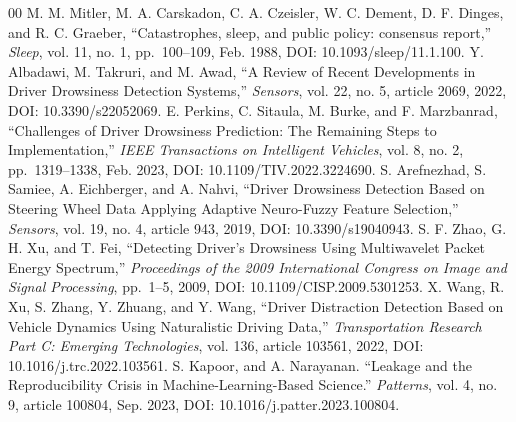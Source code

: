 \documentclass[letterpaper, 10 pt, conference]{ieeeconf}  %
\begin{document}




\begin{thebibliography}{00}
 M. M. Mitler, M. A. Carskadon, C. A. Czeisler, W. C. Dement, D. F. Dinges, and R. C. Graeber, 
    ``Catastrophes, sleep, and public policy: consensus report,'' 
    \textit{Sleep}, vol. 11, no. 1, pp.~100--109, Feb. 1988, DOI: 10.1093/sleep/11.1.100.
 Y. Albadawi, M. Takruri, and M. Awad,  
    ``A Review of Recent Developments in Driver Drowsiness Detection Systems,''  
    \textit{Sensors}, vol. 22, no. 5, article 2069, 2022, DOI: 10.3390/s22052069.
 E. Perkins, C. Sitaula, M. Burke, and F. Marzbanrad,  
    ``Challenges of Driver Drowsiness Prediction: The Remaining Steps to Implementation,''  
    \textit{IEEE Transactions on Intelligent Vehicles}, vol. 8, no. 2, pp.~1319--1338, Feb. 2023, DOI: 10.1109/TIV.2022.3224690.
 S. Arefnezhad, S. Samiee, A. Eichberger, and A. Nahvi,
    ``Driver Drowsiness Detection Based on Steering Wheel Data Applying Adaptive Neuro-Fuzzy Feature Selection,''
    \textit{Sensors}, vol. 19, no. 4, article 943, 2019, DOI: 10.3390/s19040943.
 S. F. Zhao, G. H. Xu, and T. Fei,
    ``Detecting Driver's Drowsiness Using Multiwavelet Packet Energy Spectrum,''
    \textit{Proceedings of the 2009 International Congress on Image and Signal Processing}, pp.~1--5, 2009, DOI: 10.1109/CISP.2009.5301253.
 X. Wang, R. Xu, S. Zhang, Y. Zhuang, and Y. Wang,
    ``Driver Distraction Detection Based on Vehicle Dynamics Using Naturalistic Driving Data,''
    \textit{Transportation Research Part C: Emerging Technologies}, vol. 136, article 103561, 2022, DOI: 10.1016/j.trc.2022.103561.
 S. Kapoor, and A. Narayanan. 
    ``Leakage and the Reproducibility Crisis in Machine-Learning-Based Science.''
    \textit{Patterns}, vol. 4, no. 9, article 100804, Sep. 2023, DOI: 10.1016/j.patter.2023.100804.

\end{thebibliography}
\end{document}
